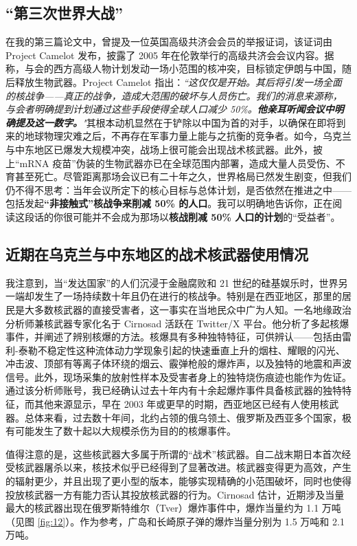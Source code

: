 \documentclass[10pt,twocolumn,letterpaper]{article}
\begin{document}
\subsection{“第三次世界大战”}
在我的第三篇论文中，曾提及一位英国高级共济会会员的举报证词，该证词由 Project Camelot 发布，披露了 2005 年在伦敦举行的高级共济会会议内容。据称，与会的西方高级人物计划发动一场小范围的核冲突，目标锁定伊朗与中国，随后释放生物武器。Project Camelot 指出：\textit{“这仅仅是开始。其后将引发一场全面的核战争——真正的战争，造成大范围的破坏与人员伤亡。我们的消息来源称，与会者明确提到计划通过这些手段使得全球人口减少 50\%。\textbf{他亲耳听闻会议中明确提及这一数字。}"}\cite{23}其根本动机显然在于铲除以中国为首的对手，以确保在即将到来的地球物理灾难之后，不再存在军事力量上能与之抗衡的竞争者。如今，乌克兰与中东地区已爆发大规模冲突，战场上很可能会出现战术核武器。此外，披上“mRNA 疫苗”伪装的生物武器亦已在全球范围内部署，造成大量人员受伤、不育甚至死亡。尽管距离那场会议已有二十年之久，世界格局已然发生剧变，但我们仍不得不思考：当年会议所定下的核心目标与总体计划，是否依然在推进之中——包括发起\textbf{“非接触式”核战争来削减 50\% 的人口}。我可以明确地告诉你，正在阅读这段话的你很可能并不会成为那场以\textbf{核战削减 50\% 人口的计划}的“受益者”。

\subsection{近期在乌克兰与中东地区的战术核武器使用情况}
我注意到，当“发达国家”的人们沉浸于金融腐败和 21 世纪的硅基娱乐时，世界另一端却发生了一场持续数十年且仍在进行的核战争。特别是在西亚地区，那里的居民是大多数核武器的直接受害者，这一事实在当地民众中广为人知。一名地缘政治分析师兼核武器专家化名于 Cirnosad 活跃在 Twitter/X 平台。他分析了多起核爆事件，并阐述了辨别核爆的方法\cite{24}。核爆具有多种独特特征，可供辨认——包括由雷利-泰勒不稳定性这种流体动力学现象引起的快速垂直上升的烟柱、耀眼的闪光、冲击波、顶部有等离子体环绕的烟云、霰弹枪般的爆炸声，以及独特的地震和声波信号。此外，现场采集的放射性样本及受害者身上的独特烧伤痕迹也能作为佐证。通过该分析师账号，我已经确认过去十年内有十余起爆炸事件具备核武器的独特特征，而其他来源显示，早在 2003 年或更早的时期，西亚地区已经有人使用核武器。总体来看，过去数十年间，北约占领的俄乌领土、俄罗斯及西亚多个国家，极有可能发生了数十起以大规模杀伤为目的的核爆事件。

值得注意的是，这些核武器大多属于所谓的“战术”核武器。自二战末期日本首次经受核武器屠杀以来，核技术似乎已经得到了显著改进。核武器变得更为高效，产生的辐射更少，并且出现了更小型的版本，能够实现精确的小范围破坏，同时也使得投放核武器一方有能力否认其投放核武器的行为\cite{29}。Cirnosad 估计，近期涉及当量最大的核武器出现在俄罗斯特维尔（Tver）爆炸事件中，爆炸当量约为 1.1 万吨\cite{24}（见图 \ref{fig:12}）。作为参考，广岛和长崎原子弹的爆炸当量分别为 1.5 万吨和 2.1 万吨\cite{30}。
\end{document}
